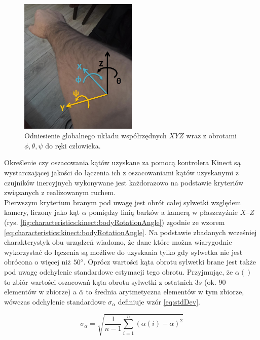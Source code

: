 \begin{figure}[!htb]
	\centering	
	\includegraphics[width=0.5\textwidth]{images/handAxes.jpg}	
	\caption{Odniesienie globalnego układu współrzędnych $XYZ$ wraz z obrotami $\phi , \theta , \psi$ do ręki człowieka.}
	\label{fig:handAxes}
\end{figure}

Określenie czy oszacowania kątów uzyskane za pomocą kontrolera Kinect są wystarczającej jakości do łączenia ich z oszacowaniami kątów uzyskanymi z czujników inercyjnych wykonywane jest każdorazowo na podstawie kryteriów związanych z realizowanym ruchem. \\
Pierwszym kryterium branym pod uwagę jest obrót całej sylwetki względem kamery, liczony jako kąt $\alpha$ pomiędzy linią barków a kamerą w płaszczyźnie $X$--$Z$ (rys. \ref{fig:characteristics:kinect:bodyRotationAngle}) zgodnie ze wzorem \eqref{eq:characteristics:kinect:bodyRotationAngle}. Na podstawie zbadanych wcześniej charakterystyk obu urządzeń wiadomo, że dane które można wiarygodnie wykorzystać do łączenia są możliwe do uzyskania tylko gdy sylwetka nie jest obrócona o więcej niż $50\degree$. Oprócz wartości kąta obrotu sylwetki brane jest także pod uwagę odchylenie standardowe estymacji tego obrotu. Przyjmując, że $\alpha()$
to zbiór wartości oszacowań kąta obrotu sylwetki z ostatnich $3s$ (ok. 90 elementów w zbiorze) a $\bar{\alpha}$ to średnia arytmetyczna elementów w tym zbiorze, wówczas odchylenie standardowe $\sigma_\alpha$ definiuje wzór \eqref{eq:stdDev}.

\begin{equation}
	\sigma_\alpha = \sqrt{\frac{1}{n-1}\sum_{i=1}^{n}{(\alpha(i) - \bar{\alpha})^2}}
	\label{eq:stdDev}
\end{equation}


